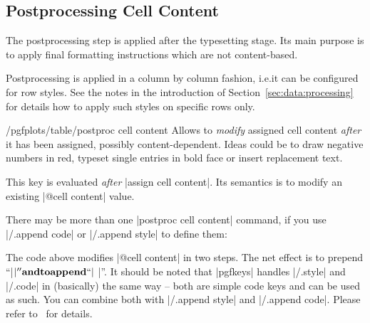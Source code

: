 \documentclass[a4paper]{ltxdoc}
\begin{document}
\subsection{Postprocessing Cell Content}

The postprocessing step is applied after the typesetting stage. Its main
purpose is to apply final formatting instructions which are not content-based.

Postprocessing is applied in a column by column fashion, i.e.\@ it can be
configured for row styles. See the notes in the introduction of
Section~\ref{sec:data:processing} for details how to apply such styles on
specific rows only.

\begin{codekey}{/pgfplots/table/postproc cell content}
    Allows to \emph{modify} assigned cell content \emph{after} it has been
    assigned, possibly content-dependent. Ideas could be to draw negative
    numbers in red, typeset single entries in bold face or insert replacement
    text.

    This key is evaluated \emph{after} |assign cell content|. Its semantics is
    to modify an existing |@cell content| value.

    There may be more than one |postproc cell content| command, if you use
    |/.append code| or |/.append style| to define them:
\begin{codeexample}[]
\end{codeexample}
    The code above modifies |@cell content| in two steps. The net effect is to
    prepend ``|$\bf |'' and to append  ``|$ \EUR|''. It should be noted that
    |pgfkeys| handles |/.style| and |/.code| in (basically) the same way --
    both are simple code keys and can be used as such. You can combine both
    with |/.append style| and |/.append code|. Please refer to~\cite[section
    about pgfkeys]{tikz} for details.


\end{codekey}
\end{document}
